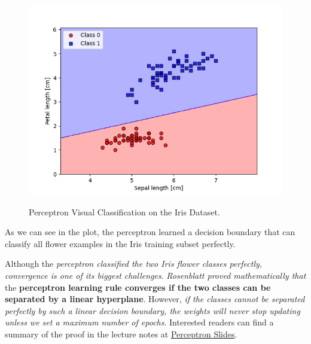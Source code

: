 \documentclass[../machine_learning_scikit.tex]{subfiles}
\begin{document}
    \begin{figure}[h]
        \begin{minipage}{\textwidth}
            \centering
            \includegraphics[scale=1]{images/perceptron_visual_implementation_iris_dataset.png} \\
            \caption{Perceptron Visual Classification on the Iris Dataset.}
            \label{figure:percepron_visual_classification_iris_dataset}
        \end{minipage}
    \end{figure}

    As we can see in the plot, the perceptron learned a decision boundary that can classify all flower examples in the Iris training subset perfectly.

    \begin{obs}
        Although the \textit{perceptron classified the two Iris flower classes perfectly, convergence is one of its biggest challenges}. \textit{Rosenblatt proved mathematically that} the \textbf{perceptron learning rule converges if the two classes can be separated by a linear hyperplane}. However, \textit{if the classes cannot be separated perfectly by such a linear decision boundary, the weights will never stop updating unless we set a maximum number of epochs}. Interested readers can find a summary of the proof in the lecture notes at \href{https://sebastianraschka.com/pdf/lecture-notes/stat453ss21/L03_perceptron_slides.pdf}{Perceptron Slides}.
    \end{obs}

    
\end{document}
